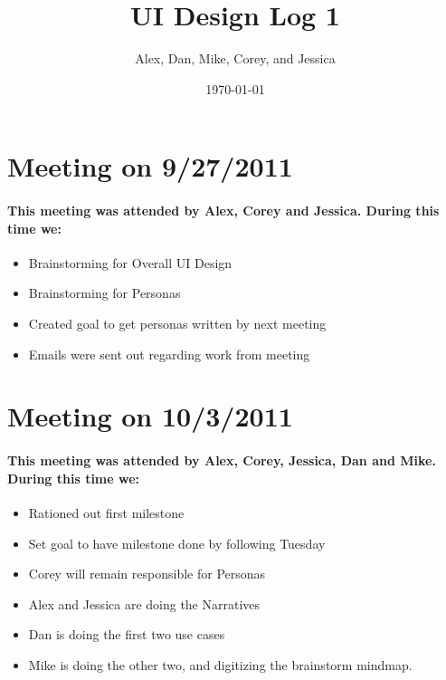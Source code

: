 \documentclass{article}
\title{UI Design Log 1}
\author{Alex, Dan, Mike, Corey, and Jessica}
\date{\today}
\begin{document}
\maketitle
\section{Meeting on 9/27/2011}
\paragraph{This meeting was attended by Alex, Corey and Jessica.  During this
time we:}
\begin{itemize}
\item Brainstorming for Overall UI Design
\item Brainstorming for Personas
\item Created goal to get personas written by next meeting
\item Emails were sent out regarding work from meeting
\end{itemize}

\section{Meeting on 10/3/2011}
\paragraph{This meeting was attended by Alex, Corey, Jessica, Dan and Mike.
During this time we:}
\begin{itemize}
\item Rationed out first milestone
\item Set goal to have milestone done by following Tuesday
\item Corey will remain responsible for Personas
\item Alex and Jessica are doing the Narratives
\item Dan is doing the first two use cases
\item Mike is doing the other two, and digitizing the brainstorm mindmap.
\end{itemize}
\end{document}

